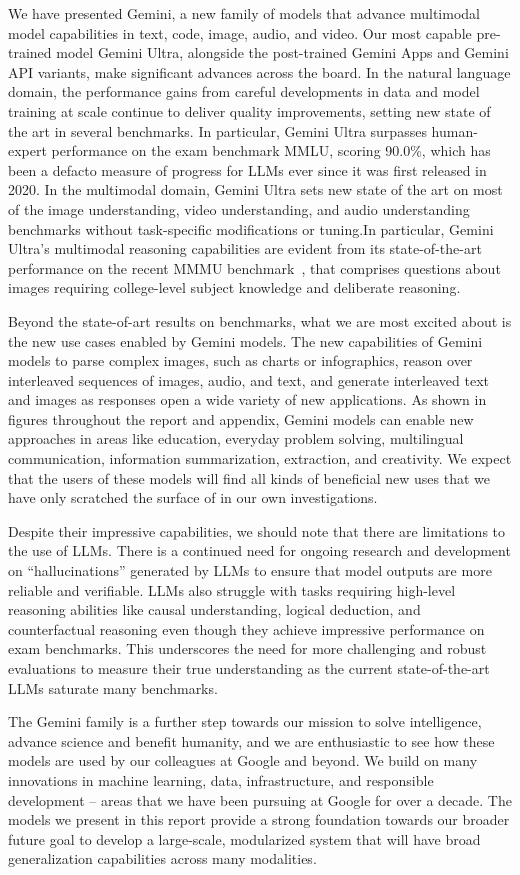 We have presented Gemini, a new family of models that advance multimodal model capabilities in text, code, image, audio, and video. Our most capable pre-trained model Gemini Ultra, alongside the post-trained Gemini Apps and Gemini API variants, make significant advances across the board. In the natural language domain, the performance gains from careful developments in data and model training at scale continue to deliver quality improvements, setting new state of the art in several benchmarks. In particular, Gemini Ultra surpasses human-expert performance on the exam benchmark MMLU, scoring 90.0\%, which has been a defacto measure of progress for LLMs ever since it was first released in 2020. In the multimodal domain, Gemini Ultra sets new state of the art on most of the image understanding, video understanding, and audio understanding benchmarks without task-specific modifications or tuning.In particular, Gemini Ultra’s multimodal reasoning capabilities are evident from its state-of-the-art performance on the recent MMMU benchmark~\cite{mmmu}, that comprises questions about images requiring college-level subject knowledge and deliberate reasoning.

Beyond the state-of-art results on benchmarks, what we are most excited about is the new use cases enabled by Gemini models. The new capabilities of Gemini models to parse complex images, such as charts or infographics, reason over interleaved sequences of images, audio, and text, and generate interleaved text and images as responses open a wide variety of new applications. As shown in figures throughout the report and appendix, Gemini models can enable new approaches in areas like education, everyday problem solving, multilingual communication, information summarization, extraction, and creativity. We expect that the users of these models will find all kinds of beneficial new uses that we have only scratched the surface of in our own investigations.

Despite their impressive capabilities, we should note that there are limitations to the use of LLMs. There is a continued need for ongoing research and development on ``hallucinations'' generated by LLMs to ensure that model outputs are more reliable and verifiable. LLMs also struggle with tasks requiring high-level reasoning abilities like causal understanding, logical deduction, and counterfactual reasoning even though they achieve impressive performance on exam benchmarks. This underscores the need for more challenging and robust evaluations to measure their true understanding as the current state-of-the-art LLMs saturate many benchmarks.

The Gemini family is a further step towards our mission to solve intelligence, advance science and benefit humanity, and we are enthusiastic to see how these models are used by our colleagues at Google and beyond. We build on many innovations in machine learning, data, infrastructure, and responsible development -- areas that we have been pursuing at Google for over a decade. The models we present in this report provide a strong foundation towards our broader future goal to develop a large-scale, modularized system that will have broad generalization capabilities across many modalities.


